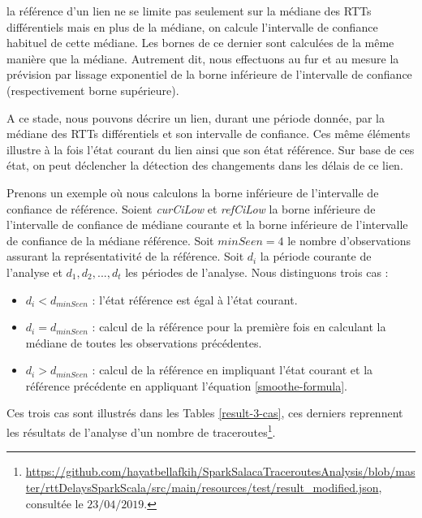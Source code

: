 la référence d'un lien ne se limite pas seulement sur la médiane des RTTs différentiels mais en plus de la médiane,  on calcule  l'intervalle de confiance habituel de cette médiane. Les bornes de ce dernier sont calculées de la même manière que la médiane. Autrement dit, nous effectuons au fur et au mesure la prévision par lissage exponentiel de la borne inférieure de l'intervalle de confiance (respectivement borne supérieure). 

A ce stade, nous pouvons décrire un lien, durant une période donnée, par la médiane des RTTs différentiels et son intervalle de confiance. Ces même éléments illustre à la fois l'état courant du lien ainsi que son état référence. Sur base de ces état, on peut déclencher la détection des changements dans les délais de ce lien.

Prenons un exemple où nous calculons la borne inférieure de l'intervalle de confiance de référence. 
Soient \textit{curCiLow} et \textit{refCiLow} la borne inférieure de l'intervalle de confiance de médiane courante et la borne inférieure de l'intervalle de confiance de la médiane référence.
Soit  $minSeen = 4$ le nombre d'observations assurant la représentativité de la référence. Soit $d_i$ la période courante de l'analyse et $d_1, d_2, ..., d_t$ les périodes de l'analyse. Nous distinguons trois cas :
\begin{itemize}
	\item  $d_i< d_{minSeen}$ : l'état référence est égal à l'état courant.
	\item  $d_i = d_{minSeen}$ : calcul de la référence pour la première fois en calculant la médiane de toutes les observations précédentes.
	\item  $d_i >d_{minSeen}$ : calcul de la référence en impliquant l'état courant et la référence précédente en appliquant l'équation \ref{smoothe-formula}.
\end{itemize}

Ces trois cas sont illustrés dans les  Tables \ref{result-3-cas}, ces derniers reprennent les résultats de l'analyse d'un nombre de traceroutes\footnote{\url{https://github.com/hayatbellafkih/SparkSalacaTraceroutesAnalysis/blob/master/rttDelaysSparkScala/src/main/resources/test/result_modified.json}, consultée  le $23/04/2019$. }.

